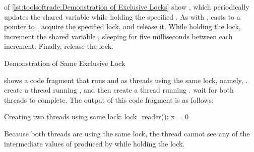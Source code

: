 \QuickQuizEnd

\begin{fcvref}
 of
\cref{lst:toolsoftrade:Demonstration of Exclusive Locks}
show , which
periodically updates the shared variable  while holding the
specified .
As with ,  casts  to a pointer
to ,
 acquire the specified lock,
and  release it.
While holding the lock, 
increment the shared variable ,
sleeping for five milliseconds between each increment.
Finally,  release the lock.
\end{fcvref}

\begin{listing}

\caption{Demonstration of Same Exclusive Lock}
\label{lst:toolsoftrade:Demonstration of Same Exclusive Lock}
\end{listing}

\begin{fcvref}
shows a code fragment that runs  and
 as threads using the same lock, namely, .
 create a thread
running , and then
 create a thread
running .
 wait for both threads to complete.
The output of this code fragment is as follows:
\end{fcvref}

\begin{VerbatimU}
Creating two threads using same lock:
lock_reader(): x = 0
\end{VerbatimU}

Because both threads are using the same lock, the 
thread cannot see any of the intermediate values of  produced
by  while holding the lock.

